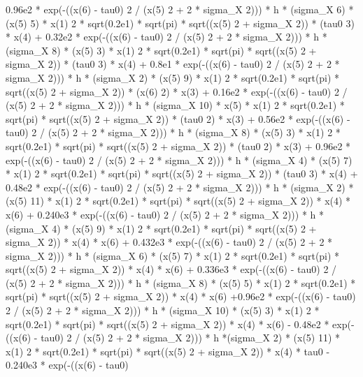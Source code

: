 \begin{maplegroup}
0.96e2 * exp(-((x(6) - tau0)  2 / (x(5)  2 + 2 * sigma\_X  2))) * h * (sigma\_X 6) * (x(5)  5) * x(1)  2 * sqrt(0.2e1) * sqrt(pi) * sqrt((x(5)  2 + sigma\_X  2)) * (tau0  3) * x(4) + 0.32e2 * exp(-((x(6) - tau0)  2 / (x(5)  2 + 2 * sigma\_X  2))) * h * (sigma\_X  8) * (x(5)  3) * x(1)  2 * sqrt(0.2e1) * sqrt(pi) * sqrt((x(5) 2 + sigma\_X  2)) * (tau0  3) * x(4) + 0.8e1 * exp(-((x(6) - tau0)  2 / (x(5)  2 + 2 * sigma\_X  2))) * h * (sigma\_X  2) * (x(5)  9) * x(1)  2 * sqrt(0.2e1) * sqrt(pi) * sqrt((x(5)  2 + sigma\_X  2)) * (x(6)  2) * x(3) + 0.16e2 * exp(-((x(6) - tau0)  2 / (x(5)  2 + 2 * sigma\_X  2))) * h * (sigma\_X  10) * x(5) * x(1)  2 * sqrt(0.2e1) * sqrt(pi) * sqrt((x(5)  2 + sigma\_X  2)) * (tau0  2) * x(3) + 0.56e2 * exp(-((x(6) - tau0)  2 / (x(5)  2 + 2 * sigma\_X  2))) * h * (sigma\_X  8) * (x(5) 3) * x(1)  2 * sqrt(0.2e1) * sqrt(pi) * sqrt((x(5)  2 + sigma\_X  2)) * (tau0  2) * x(3) + 0.96e2 * exp(-((x(6) - tau0)  2 / (x(5)  2 + 2 * sigma\_X  2))) * h * (sigma\_X  4) * (x(5)  7) * x(1)  2 * sqrt(0.2e1) * sqrt(pi) * sqrt((x(5)  2 + sigma\_X 2)) * (tau0  3) * x(4) + 0.48e2 * exp(-((x(6) - tau0)  2 / (x(5)  2 + 2 * sigma\_X  2))) * h * (sigma\_X  2) * (x(5)  11) * x(1)  2 * sqrt(0.2e1) * sqrt(pi) * sqrt((x(5)  2 + sigma\_X  2)) * x(4) * x(6) + 0.240e3 * exp(-((x(6) - tau0)  2 / (x(5) 2 + 2 * sigma\_X  2))) * h * (sigma\_X  4) * (x(5)  9) * x(1)  2 * sqrt(0.2e1) * sqrt(pi) * sqrt((x(5)  2 + sigma\_X  2)) * x(4) * x(6) + 0.432e3 * exp(-((x(6) - tau0)  2 / (x(5)  2 + 2 * sigma\_X  2))) * h * (sigma\_X  6) * (x(5)  7) * x(1)  2 * sqrt(0.2e1) * sqrt(pi) * sqrt((x(5)  2 + sigma\_X  2)) * x(4) * x(6) + 0.336e3 * exp(-((x(6) - tau0)  2 / (x(5)  2 + 2 * sigma\_X  2))) * h * (sigma\_X  8) * (x(5)  5) * x(1)  2 * sqrt(0.2e1) * sqrt(pi) * sqrt((x(5)  2 + sigma\_X  2)) * x(4) * x(6) +0.96e2 * exp(-((x(6) - tau0)  2 / (x(5)  2 + 2 * sigma\_X  2))) * h * (sigma\_X  10) * (x(5)  3) * x(1)  2 * sqrt(0.2e1) * sqrt(pi) * sqrt((x(5)  2 + sigma\_X  2)) * x(4) * x(6) - 0.48e2 * exp(-((x(6) - tau0)  2 / (x(5)  2 + 2 * sigma\_X  2))) * h *(sigma\_X  2) * (x(5)  11) * x(1)  2 * sqrt(0.2e1) * sqrt(pi) * sqrt((x(5)  2 + sigma\_X  2)) * x(4) * tau0 - 0.240e3 * exp(-((x(6) - tau0) 
\end{maplegroup}
